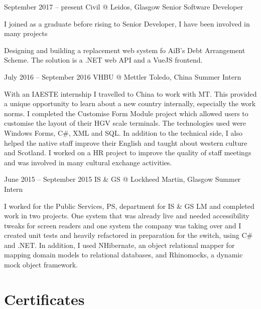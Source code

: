 \documentclass{tccv}
\begin{document}
\begin{eventlist}


\item{September 2017 -- present}
     {Civil @ Leidos, Glasgow}
     {Senior Software Developer}

I joined as a graduate before rising to Senior Developer, I have been involved in many projects 


Designing and building a replacement web system fo AiB's Debt Arrangement Scheme. The solution is a .NET web API and a VueJS frontend. 

\item{July 2016 -- September 2016}
     {VHBU @ Mettler Toledo, China}
     {Summer Intern}

With an IAESTE internship I travelled to China to work with MT. This provided a unique opportunity to learn about a new country internally, especially the work norms. I completed the Customise Form Module project which allowed users to customise the layout of their HGV scale terminals. The technologies used were Windows Forms, C\#, XML and SQL. In addition to the technical side, I also helped the native staff improve their English and taught about western culture and Scotland. I worked on a HR project to improve the quality of staff meetings and was involved in many cultural exchange activities.

\item{June 2015 -- September 2015}
     {IS \& GS @ Lockheed Martin, Glasgow}
     {Summer Intern}

I worked for the Public Services, PS, department for IS \& GS LM and completed work in two projects. One system that was already live and needed accessibility tweaks for screen readers and one system the company was taking over and I created unit tests and heavily refactored in preparation for the switch, using C\# and .NET. In addition, I used NHibernate, an object relational mapper for mapping domain models to relational databases, and Rhinomocks, a dynamic mock object framework.

     



\end{eventlist}


\section{Certificates}
\end{document}
